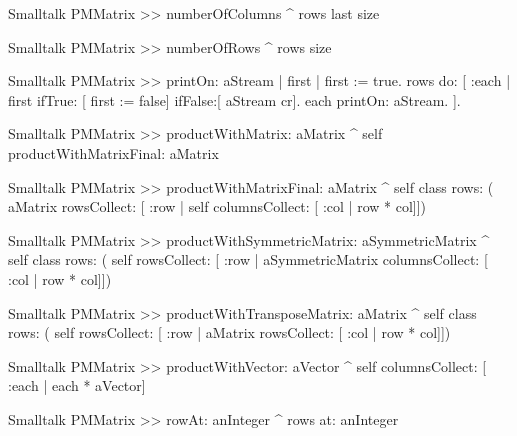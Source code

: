 \begin{displaycode}{Smalltalk}
PMMatrix >> numberOfColumns
    ^ rows last size
\end{displaycode}

\begin{displaycode}{Smalltalk}
PMMatrix >> numberOfRows
    ^ rows size
\end{displaycode}

\begin{displaycode}{Smalltalk}
PMMatrix >> printOn: aStream
    | first |
    first := true.
    rows do: 
        [ :each |
          first ifTrue: [ first := false]
                 ifFalse:[ aStream cr].
          each printOn: aStream.
        ].
\end{displaycode}

\begin{displaycode}{Smalltalk}
PMMatrix >> productWithMatrix: aMatrix
    ^ self productWithMatrixFinal: aMatrix
\end{displaycode}

\begin{displaycode}{Smalltalk}
PMMatrix >> productWithMatrixFinal: aMatrix
    ^ self class rows: ( aMatrix rowsCollect: [ :row | self 
                                 columnsCollect: [ :col | row * col]])
\end{displaycode}

\begin{displaycode}{Smalltalk}
PMMatrix >> productWithSymmetricMatrix: aSymmetricMatrix
    ^ self class rows: ( self rowsCollect: [ :row | aSymmetricMatrix 
                                 columnsCollect: [ :col | row * col]])
\end{displaycode}

\begin{displaycode}{Smalltalk}
PMMatrix >> productWithTransposeMatrix: aMatrix
    ^ self class rows: ( self rowsCollect: [ :row | aMatrix 
                                    rowsCollect: [ :col | row * col]])
\end{displaycode}

\begin{displaycode}{Smalltalk}
PMMatrix >> productWithVector: aVector
    ^ self columnsCollect: [ :each | each * aVector]
\end{displaycode}

\begin{displaycode}{Smalltalk}
PMMatrix >> rowAt: anInteger
    ^ rows at: anInteger
\end{displaycode}

